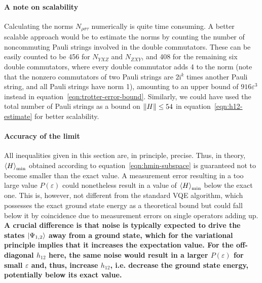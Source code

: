 \documentclass[a4paper,12pt]{article}
\newcommand{\rmi}{\mathrm{i}}
\newcommand{\warning}[1]{{\bfseries\color{red}#1}}
\begin{document}
\paragraph{A note on scalability}
Calculating the norms $N_{\rho\sigma\tau}$ numerically is quite time consuming. A better scalable approach would be to estimate the norms by counting the number of noncommuting Pauli strings involved in the double commutators. These can be easily counted to be 456 for $N_{YXZ}$ and $N_{ZXY}$, and 408 for the remaining six double commutators, where every double commutator adds 4 to the norm (note that the nonzero commutators of two Pauli strings are $2\rmi^k$ times another Pauli string, and all Pauli strings have norm 1), amounting to an upper bound of $916 \varepsilon^3$ instead in equation~\eqref{eqn:trotter-error-bound}. Similarly, we could have used the total number of Pauli strings as a bound on $\norm{H} \leq 54$ in equation~\eqref{eqn:h12-estimate} for better scalability.

\paragraph{Accuracy of the limit}
All inequalities given in this section are, in principle, precise. Thus, in theory, $\ev{H}_\text{min}$ obtained according to equation~\eqref{eqn:hmin-subspace} is guaranteed not to become smaller than the exact value. A measurement error resulting in a too large value $P(\varepsilon)$ could nonetheless result in a value of $\ev{H}_\text{min}$ below the exact one. This is, however, not different from the standard VQE algorithm, which possesses the exact ground state energy as a theoretical bound but could fall below it by coincidence due to measurement errors on single operators adding up.
\warning{A crucial difference is that noise is typically expected to drive the states $\left\vert{\Psi_{1,2}}\right\rangle$ away from a ground state, which for the variational principle implies that it increases the expectation value. For the off-diagonal $h_{12}$ here, the same noise would result in a larger $P(\varepsilon)$ for small $\varepsilon$ and, thus, increase $h_{12}$, i.e. decrease the ground state energy, potentially below its exact value.}
\end{document}
